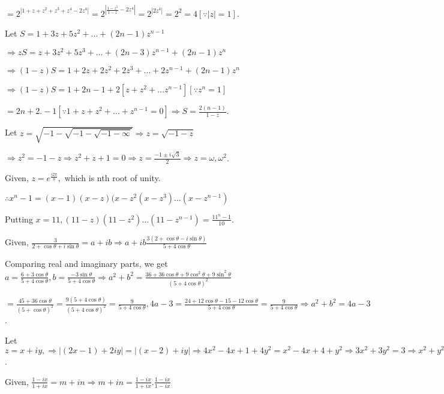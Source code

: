   $= 2^{|1 + z + z^2 + z^3 + z^4 - 2z^4|} = 2^{\left|\frac{1 - z^5}{1 - z} - 2z^4\right|} = 2^{|2z^4|} = 2^2
  = 4[\because |z| = 1]$.
\item Let $S = 1 + 3z + 5z^2 + \ldots + (2n - 1)z^{n - 1}$

  $\Rightarrow zS = z + 3z^2 + 5z^3 + \ldots + (2n - 3)z^{n - 1} + (2n - 1)z^n$

  $\Rightarrow (1 - z)S = 1 + 2z + 2z^2 + 2z^3 + \ldots + 2z^{n - 1} + (2n - 1)z^n$

  $\Rightarrow (1 - z)S = 1 + 2n - 1 + 2[z + z^2 + \ldots z^{n - 1}][\because z^n = 1]$

  $= 2n + 2.-1[\because 1 + z + z^2 + \ldots + z^{n - 1} = 0] \Rightarrow S = \frac{2(n - 1)}{1 - z}$.
\item Let $z = \sqrt{-1-\sqrt{-1-\sqrt{-1-\infty}}} \Rightarrow z = \sqrt{-1 - z}$

  $\Rightarrow z^2 = -1 - z \Rightarrow z^2 + z + 1 = 0 \Rightarrow z = \frac{-1 \pm i\sqrt{3}}{2}
  \Rightarrow z = \omega, \omega^2$.
\item Given, $z = e^{\frac{i2\pi}{n}},$ which is nth root of unity.

  $\therefore x^n - 1 = (x - 1)(x - z)(x - z^2 (x - z^3) ... (x - z^{n - 1})$

  Putting $x = 11, (11 - z)(11 - z^2)\ldots(11 - z^{n - 1}) = \frac{11^n - 1}{10}$.
\item Given, $\frac{3}{2 + \cos\theta + i\sin\theta} = a + ib \Rightarrow a + ib  \frac{3(2 + \cos\theta -
  i\sin\theta)}{5 + 4\cos\theta}$

  Comparing real and imaginary parts, we get $a = \frac{6 + 3\cos\theta}{5 + 4\cos\theta}, b =
  \frac{-3\sin\theta}{5 + 4\cos\theta} \Rightarrow a^2 + b^2 = \frac{36 + 36\cos\theta + 9\cos^2\theta +
    9\sin^2\theta}{(5 + 4\cos\theta)^2}$

  $= \frac{45 + 36\cos\theta}{(5 + \cos\theta)^2} = \frac{9(5 + 4\cos\theta)}{(5 + 4\cos\theta)^2} =
  \frac{9}{5 + 4\cos\theta}, 4a - 3 = \frac{24 + 12\cos\theta - 15 - 12\cos\theta}{5 +
    4\cos\theta} = \frac{9}{5 + 4\cos\theta}\Rightarrow a^2 + b^2 = 4a - 3$.
\item Let $z = x + iy, \Rightarrow |(2x - 1) + 2iy| = |(x - 2) + iy|\Rightarrow 4x^2 - 4x + 1 + 4y^2 = x^2 -
  4x + 4 + y^2 \Rightarrow 3x^2 + 3y^2 = 3\Rightarrow x^2 + y^2 = 1\Rightarrow |z| = 1$.
\item Given, $\frac{1 -ix}{1 + ix} = m + in \Rightarrow m + in = \frac{1 - ix}{1 + ix}.\frac{1 - ix}{1 - ix}$

